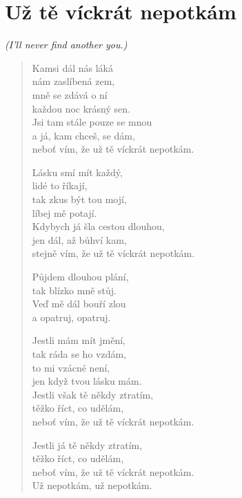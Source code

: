 \section{Už tě víckrát nepotkám}
\textit{(I'll never find another you.)}

\begin{verse}
Kamsi dál nás láká \\
nám zaslíbená zem,\\
mně se zdává o ní\\
každou noc krásný sen.\\
Jsi tam stále pouze se mnou\\
a já, kam chceš, se dám,\\
neboť vím, že už tě víckrát nepotkám.

Lásku smí mít každý, \\
lidé to říkají, \\
tak zkus být tou mojí, \\
líbej mě potají. \\
Kdybych já šla cestou dlouhou, \\
jen dál, až bůhví kam, \\
stejně vím, že už tě víckrát nepotkám.

Půjdem dlouhou plání, \\
tak blízko mně stůj. \\
Veď mě dál bouří zlou \\
a opatruj, opatruj. 

Jestli mám mít jmění, \\
tak ráda se ho vzdám, \\
to mi vzácné není, \\
jen když tvou lásku mám. \\
Jestli však tě někdy ztratím, \\
těžko říct, co udělám, \\
neboť vím, že už tě víckrát nepotkám. 

Jestli já tě někdy ztratím, \\
těžko říct, co udělám, \\
neboť vím, že už tě víckrát nepotkám. \\
Už nepotkám, už nepotkám.
\end{verse}

